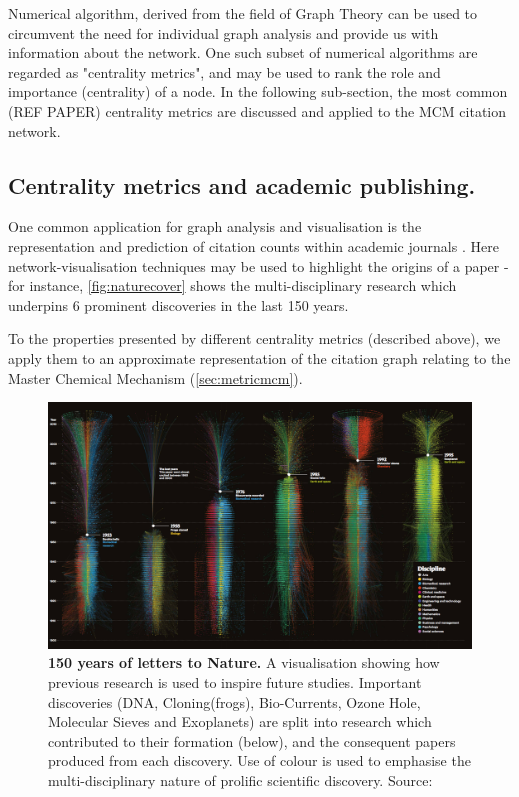 Numerical algorithm, derived from the field of Graph Theory can be used to circumvent the need for individual graph analysis and provide us with information about the network. One such subset of numerical algorithms are regarded as "centrality metrics", and may be used to rank the role and importance (centrality) of a node. In the following sub-section, the most common (REF PAPER) centrality metrics are discussed and applied to the MCM citation network. 


\subsection{Centrality metrics and academic publishing.}


One common application for graph analysis and visualisation is the representation and prediction of citation counts within academic journals \citep{cocite,google,naturecitation,netcoauthor}. Here network-visualisation techniques may be used to highlight the origins of a paper - for instance, \autoref{fig:naturecover} shows the multi-disciplinary research which underpins 6 prominent discoveries in the last 150 years. 

To the properties presented by different centrality metrics (described above), we apply them to an approximate representation of the citation graph relating to the Master Chemical Mechanism (\autoref{sec:metricmcm}).

\begin{figure}[H]
     \centering
         \includegraphics[width=0.92\textheight,angle=90]{figures_c3/naturegraph.png}

        \caption{\textbf{150 years of letters to Nature.} A visualisation showing how previous research is used to inspire future studies. Important discoveries (DNA, Cloning(frogs), Bio-Currents, Ozone Hole, Molecular Sieves and Exoplanets) are split into research which contributed to their formation (below), and the consequent papers produced from each discovery. Use of colour is used to emphasise the multi-disciplinary nature of prolific scientific discovery. Source: \citep{naturecover}}
        \label{fig:naturecover}
\end{figure}



